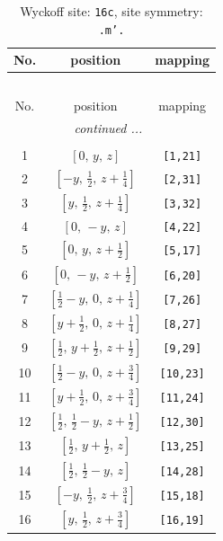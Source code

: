 \documentclass[fleqn,8pt]{jsarticle}
\begin{document}
\renewcommand{\arraystretch}{1.2}
\begin{longtable}{ccc}
\caption{Wyckoff site: {\tt 16c}, site symmetry: {\tt .m'.}}
 \\
 \hline \hline
No. & position & mapping \\ \hline \endfirsthead

\multicolumn{2}{l}{\tablename\ \thetable{}} \\
 \hline \hline
No. & position & mapping \\ \hline \endhead

 \hline \hline
\multicolumn{2}{r}{\footnotesize\it continued ...} \\ \endfoot

 \hline \hline
\multicolumn{2}{r}{} \\ \endlastfoot

1 & $\left[ 0,\, y,\, z \right]$ & {\tt [1,21]} \\ \hline
2 & $\left[ - y,\, \frac{1}{2},\, z + \frac{1}{4} \right]$ & {\tt [2,31]} \\ \hline
3 & $\left[ y,\, \frac{1}{2},\, z + \frac{1}{4} \right]$ & {\tt [3,32]} \\ \hline
4 & $\left[ 0,\, - y,\, z \right]$ & {\tt [4,22]} \\ \hline
5 & $\left[ 0,\, y,\, z + \frac{1}{2} \right]$ & {\tt [5,17]} \\ \hline
6 & $\left[ 0,\, - y,\, z + \frac{1}{2} \right]$ & {\tt [6,20]} \\ \hline
7 & $\left[ \frac{1}{2} - y,\, 0,\, z + \frac{1}{4} \right]$ & {\tt [7,26]} \\ \hline
8 & $\left[ y + \frac{1}{2},\, 0,\, z + \frac{1}{4} \right]$ & {\tt [8,27]} \\ \hline
9 & $\left[ \frac{1}{2},\, y + \frac{1}{2},\, z + \frac{1}{2} \right]$ & {\tt [9,29]} \\ \hline
10 & $\left[ \frac{1}{2} - y,\, 0,\, z + \frac{3}{4} \right]$ & {\tt [10,23]} \\ \hline
11 & $\left[ y + \frac{1}{2},\, 0,\, z + \frac{3}{4} \right]$ & {\tt [11,24]} \\ \hline
12 & $\left[ \frac{1}{2},\, \frac{1}{2} - y,\, z + \frac{1}{2} \right]$ & {\tt [12,30]} \\ \hline
13 & $\left[ \frac{1}{2},\, y + \frac{1}{2},\, z \right]$ & {\tt [13,25]} \\ \hline
14 & $\left[ \frac{1}{2},\, \frac{1}{2} - y,\, z \right]$ & {\tt [14,28]} \\ \hline
15 & $\left[ - y,\, \frac{1}{2},\, z + \frac{3}{4} \right]$ & {\tt [15,18]} \\ \hline
16 & $\left[ y,\, \frac{1}{2},\, z + \frac{3}{4} \right]$ & {\tt [16,19]} \\
\end{longtable}
\end{document}
